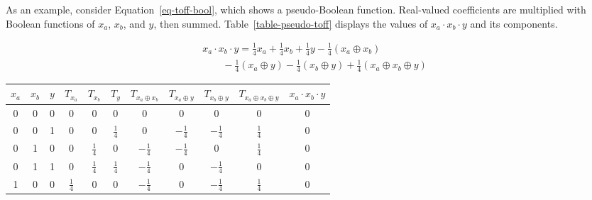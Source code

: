 \documentclass[a4paper]{article}
\begin{document}
As an example, consider Equation~\ref{eq-toff-bool}, which shows a pseudo-Boolean function. Real-valued coefficients are multiplied with Boolean functions of $x_a$, $x_b$, and $y$, then summed. Table~\ref{table-pseudo-toff} displays the values of $x_a \cdot x_b \cdot y$ and its components.

\begin{equation}
  \label{eq-toff-bool}
  \begin{aligned}
    &x_a \cdot x_b \cdot y = \frac{1}{4}x_a + \frac{1}{4}x_b + \frac{1}{4}y - \frac{1}{4}(x_a \oplus x_b) \\
    &\qquad -\frac{1}{4}(x_a \oplus y) - \frac{1}{4}(x_b \oplus y) + \frac{1}{4}(x_a \oplus x_b \oplus y)
  \end{aligned}
\end{equation}
\begin{table*}[h]
  \begin{minipage}{\textwidth}
    \begin{center}
      \scalebox{1.0} {
        \begin{tabular}{c|c|c|c|c|c|c|c|c|c|c}\hline
          $x_a$ & $x_b$ & $y$ & $T_{x_a}$         & $T_{x_b}$         & $T_{y}$         & $T_{x_a \oplus x_b}$ & $T_{x_a \oplus y}$ & $T_{x_b \oplus y}$ & $T_{x_a \oplus x_b \oplus y}$ & $x_a \cdot x_b \cdot y$\\\hline
          0     & 0     & 0   & 0                 & 0                 & 0               & 0                    & 0                  & 0                  & 0                             & 0            \\\hline
          0     & 0     & 1   & 0                 & 0                 & $\frac{1}{4}$   & 0                    & $-\frac{1}{4}$     & $-\frac{1}{4}$     & $\frac{1}{4}$                 & 0            \\\hline
          0     & 1     & 0   & 0                 & $\frac{1}{4}$     & 0               & $-\frac{1}{4}$       & $-\frac{1}{4}$     & 0                  & $\frac{1}{4}$                 & 0            \\\hline
          0     & 1     & 1   & 0                 & $\frac{1}{4}$     & $\frac{1}{4}$   & $-\frac{1}{4}$       & 0                  & $-\frac{1}{4}$     & 0                             & 0            \\\hline
          1     & 0     & 0   & $\frac{1}{4}$     & 0                 & 0               & $-\frac{1}{4}$       & 0                  & $-\frac{1}{4}$     & $\frac{1}{4}$                 & 0            \\\hline

\end{tabular}}
\end{center}
\end{minipage}
\end{table*}
\end{document}
